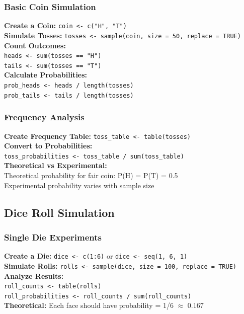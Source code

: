 \documentclass[11pt,a4paper]{article}
\begin{document}
\subsubsection{Basic Coin Simulation}

\begin{probabilitybox}
\textbf{Create a Coin:} \texttt{coin <- c("H", "T")}\\[0.3cm]
\textbf{Simulate Tosses:} \texttt{tosses <- sample(coin, size = 50, replace = TRUE)}\\[0.3cm]
\textbf{Count Outcomes:}\\
\texttt{heads <- sum(tosses == "H")}\\
\texttt{tails <- sum(tosses == "T")}\\[0.3cm]
\textbf{Calculate Probabilities:}\\
\texttt{prob\_heads <- heads / length(tosses)}\\
\texttt{prob\_tails <- tails / length(tosses)}
\end{probabilitybox}

\subsubsection{Frequency Analysis}

\begin{probabilitybox}
\textbf{Create Frequency Table:} \texttt{toss\_table <- table(tosses)}\\[0.3cm]
\textbf{Convert to Probabilities:}\\
\texttt{toss\_probabilities <- toss\_table / sum(toss\_table)}\\[0.3cm]
\textbf{Theoretical vs Experimental:}\\
Theoretical probability for fair coin: P(H) = P(T) = 0.5\\
Experimental probability varies with sample size
\end{probabilitybox}

\subsection{Dice Roll Simulation}

\subsubsection{Single Die Experiments}

\begin{probabilitybox}
\textbf{Create a Die:} \texttt{dice <- c(1:6)} or \texttt{dice <- seq(1, 6, 1)}\\[0.3cm]
\textbf{Simulate Rolls:} \texttt{rolls <- sample(dice, size = 100, replace = TRUE)}\\[0.3cm]
\textbf{Analyze Results:}\\
\texttt{roll\_counts <- table(rolls)}\\
\texttt{roll\_probabilities <- roll\_counts / sum(roll\_counts)}\\[0.3cm]
\textbf{Theoretical:} Each face should have probability = 1/6 $\approx$ 0.167
\end{probabilitybox}
\end{document}
